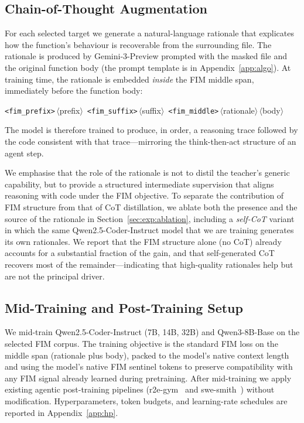 \subsection{Chain-of-Thought Augmentation}
\label{sec:method:cot}

For each selected target we generate a natural-language rationale that
explicates how the function's behaviour is recoverable from the surrounding
file. The rationale is produced by Gemini-3-Preview prompted with the
masked file and the original function body (the prompt template is in
Appendix~\ref{app:algo}). At training time, the rationale is embedded
\emph{inside} the FIM middle span, immediately before the function body:
%
\begin{center}\small
\texttt{<fim\_prefix>}\,$\langle$prefix$\rangle$\,%
\texttt{<fim\_suffix>}\,$\langle$suffix$\rangle$\,%
\texttt{<fim\_middle>}\,$\langle$rationale$\rangle$\,$\langle$body$\rangle$
\end{center}
%
The model is therefore trained to produce, in order, a reasoning trace
followed by the code consistent with that trace---mirroring the
think-then-act structure of an agent step.

We emphasise that the role of the rationale is not to distil the teacher's
generic capability, but to provide a structured intermediate supervision
that aligns reasoning with code under the FIM objective. To separate the
contribution of FIM structure from that of CoT distillation, we ablate
both the presence and the source of the rationale in
Section~\ref{sec:exp:ablation}, including a \emph{self-CoT} variant in
which the same Qwen2.5-Coder-Instruct model that we are training
generates its own rationales. We report that the FIM structure alone
(no CoT) already accounts for a substantial fraction of the gain, and that
self-generated CoT recovers most of the remainder---indicating that
high-quality rationales help but are not the principal driver.

\subsection{Mid-Training and Post-Training Setup}
\label{sec:method:setup}

We mid-train Qwen2.5-Coder-Instruct (7B, 14B, 32B) and Qwen3-8B-Base on the
selected FIM corpus. The training objective is the standard FIM loss on
the middle span (rationale plus body), packed to the model's native
context length and using the model's native FIM sentinel tokens to
preserve compatibility with any FIM signal already learned during
pretraining. After mid-training we apply existing agentic
post-training pipelines (r2e-gym~\citep{r2egym} and
swe-smith~\citep{swesmith}) without modification. Hyperparameters,
token budgets, and learning-rate schedules are reported in
Appendix~\ref{app:hp}.